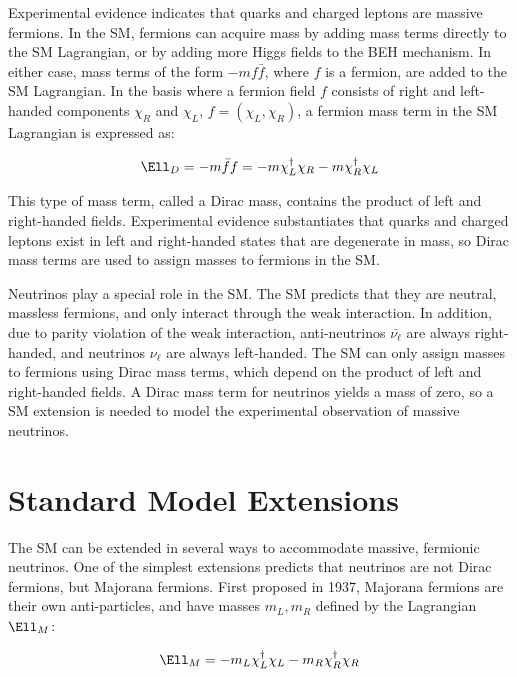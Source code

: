 Experimental evidence indicates that quarks and charged leptons are massive fermions.  In the SM, fermions 
can acquire mass by adding mass terms directly to the SM Lagrangian, or by adding more Higgs fields to the 
BEH mechanism.  In either case, mass terms of the form $-mf\bar{f}$, where $f$ is a fermion, are added to 
the SM Lagrangian.  In the basis where a fermion field $f$ consists of right and left-handed components $\chi_{R}$ 
and $\chi_{L}$, $f = (\chi_{L},\chi_{R})$, a fermion mass term in the SM Lagrangian is expressed as:

\begin{equation}
	\Ell_{D} = -m\bar{f}f = -m\chi^{\dagger}_{L}\chi_{R} - m\chi^{\dagger}_{R}\chi_{L}
\end{equation}

This type of mass term, called a Dirac mass, contains the product of left and right-handed fields.  Experimental 
evidence substantiates that quarks and charged leptons exist in left and right-handed states that are degenerate 
in mass, so Dirac mass terms are used to assign masses to fermions in the SM.

Neutrinos play a special role in the SM.  The SM predicts that they are neutral, massless fermions, and only interact 
through the weak interaction.  In addition, due to parity violation of the weak interaction, 
anti-neutrinos $\bar{\nu_{\ell}}$ are always right-handed, and neutrinos $\nu_{\ell}$ are always left-handed.  
The SM can only assign masses to fermions using Dirac mass terms, which depend on the product of left and 
right-handed fields.  A Dirac mass term for neutrinos yields a mass of zero, so a SM extension is needed 
to model the experimental observation of massive neutrinos.


\section{Standard Model Extensions}
\label{sec:lrsExtensions}
The SM can be extended in several ways to accommodate massive, fermionic neutrinos.  One of the simplest 
extensions predicts that neutrinos are not Dirac fermions, but Majorana fermions.  First proposed\cite{majoranaTheory} 
in 1937, Majorana fermions are their own anti-particles, and have masses $m_{L},m_{R}$ defined by the 
Lagrangian $\Ell_{M}$:

\begin{equation}
	\Ell_{M} = -m_{L}\chi^{\dagger}_{L}\chi_{L} - m_{R}\chi^{\dagger}_{R}\chi_{R}
\end{equation}

